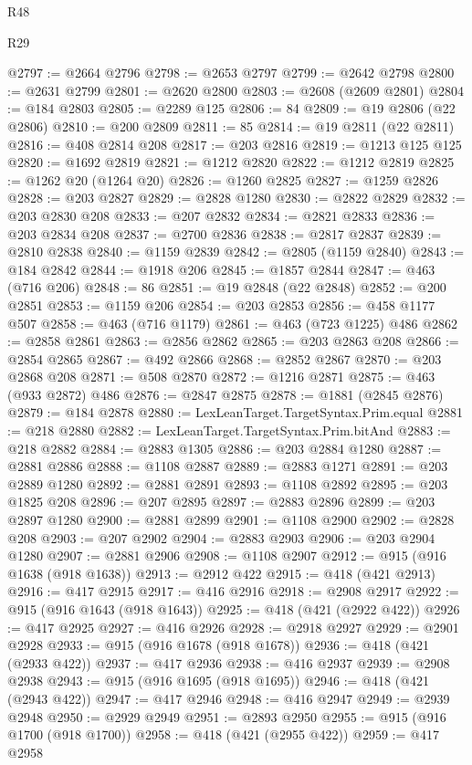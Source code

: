 \begin{lexlean}{R48}
\begin{lexlean}{R29}
\begin{coremodule}
{{{{{{{{{{{{{{{{{{{{{{{{{{{{{{{{{{{{{{{{{{{{{{{{{{{{{{{{{{{{{{{{{{{{{{{{{{{{{{{{{{{{{{{{{{{{{{{{{{{{{{{{{{{{{{{{{{{{{{{{{{{{{{{{{{{{{{{{{{{{{{{{{{{{{{{{{{{{{{{{{{{{{{{{{{{{{{{{{{{{{{{{{{{{{{{{{{{{{{{{{{{{{{{{{{{{{{{{{{@2797 := @2664 @2796
@2798 := @2653 @2797
@2799 := @2642 @2798
@2800 := @2631 @2799
@2801 := @2620 @2800
@2803 := @2608 (@2609 @2801)
@2804 := @184 @2803
@2805 := @2289 @125
@2806 := 84
@2809 := @19 @2806 (@22 @2806)
@2810 := @200 @2809
@2811 := 85
@2814 := @19 @2811 (@22 @2811)
@2816 := @408 @2814 @208
@2817 := @203 @2816
@2819 := @1213 @125 @125
@2820 := @1692 @2819
@2821 := @1212 @2820
@2822 := @1212 @2819
@2825 := @1262 @20 (@1264 @20)
@2826 := @1260 @2825
@2827 := @1259 @2826
@2828 := @203 @2827
@2829 := @2828 @1280
@2830 := @2822 @2829
@2832 := @203 @2830 @208
@2833 := @207 @2832
@2834 := @2821 @2833
@2836 := @203 @2834 @208
@2837 := @2700 @2836
@2838 := @2817 @2837
@2839 := @2810 @2838
@2840 := @1159 @2839
@2842 := @2805 (@1159 @2840)
@2843 := @184 @2842
@2844 := @1918 @206
@2845 := @1857 @2844
@2847 := @463 (@716 @206)
@2848 := 86
@2851 := @19 @2848 (@22 @2848)
@2852 := @200 @2851
@2853 := @1159 @206
@2854 := @203 @2853
@2856 := @458 @1177 @507
@2858 := @463 (@716 @1179)
@2861 := @463 (@723 @1225) @486
@2862 := @2858 @2861
@2863 := @2856 @2862
@2865 := @203 @2863 @208
@2866 := @2854 @2865
@2867 := @492 @2866
@2868 := @2852 @2867
@2870 := @203 @2868 @208
@2871 := @508 @2870
@2872 := @1216 @2871
@2875 := @463 (@933 @2872) @486
@2876 := @2847 @2875
@2878 := @1881 (@2845 @2876)
@2879 := @184 @2878
@2880 := LexLeanTarget.TargetSyntax.Prim.equal
@2881 := @218 @2880
@2882 := LexLeanTarget.TargetSyntax.Prim.bitAnd
@2883 := @218 @2882
@2884 := @2883 @1305
@2886 := @203 @2884 @1280
@2887 := @2881 @2886
@2888 := @1108 @2887
@2889 := @2883 @1271
@2891 := @203 @2889 @1280
@2892 := @2881 @2891
@2893 := @1108 @2892
@2895 := @203 @1825 @208
@2896 := @207 @2895
@2897 := @2883 @2896
@2899 := @203 @2897 @1280
@2900 := @2881 @2899
@2901 := @1108 @2900
@2902 := @2828 @208
@2903 := @207 @2902
@2904 := @2883 @2903
@2906 := @203 @2904 @1280
@2907 := @2881 @2906
@2908 := @1108 @2907
@2912 := @915 (@916 @1638 (@918 @1638))
@2913 := @2912 @422
@2915 := @418 (@421 @2913)
@2916 := @417 @2915
@2917 := @416 @2916
@2918 := @2908 @2917
@2922 := @915 (@916 @1643 (@918 @1643))
@2925 := @418 (@421 (@2922 @422))
@2926 := @417 @2925
@2927 := @416 @2926
@2928 := @2918 @2927
@2929 := @2901 @2928
@2933 := @915 (@916 @1678 (@918 @1678))
@2936 := @418 (@421 (@2933 @422))
@2937 := @417 @2936
@2938 := @416 @2937
@2939 := @2908 @2938
@2943 := @915 (@916 @1695 (@918 @1695))
@2946 := @418 (@421 (@2943 @422))
@2947 := @417 @2946
@2948 := @416 @2947
@2949 := @2939 @2948
@2950 := @2929 @2949
@2951 := @2893 @2950
@2955 := @915 (@916 @1700 (@918 @1700))
@2958 := @418 (@421 (@2955 @422))
@2959 := @417 @2958
}}}}}}}}}}}}}}}}}}}}}}}}}}}}}}}}}}}}}}}}}}}}}}}}}}}}}}}}}}}}}}}}}}}}}}}}}}}}}}}}}}}}}}}}}}}}}}}}}}}}}}}}}}}}}}}}}}}}}}}}}}}}}}}}}}}}}}}}}}}}}}}}}}}}}}}}}}}}}}}}}}}}}}}}}}}}}}}}}}}}}}}}}}}}}}}}}}}}}}}}}}}}}}}}}}}}}}}}}}
\end{coremodule}
\end{lexlean}
\end{lexlean}
